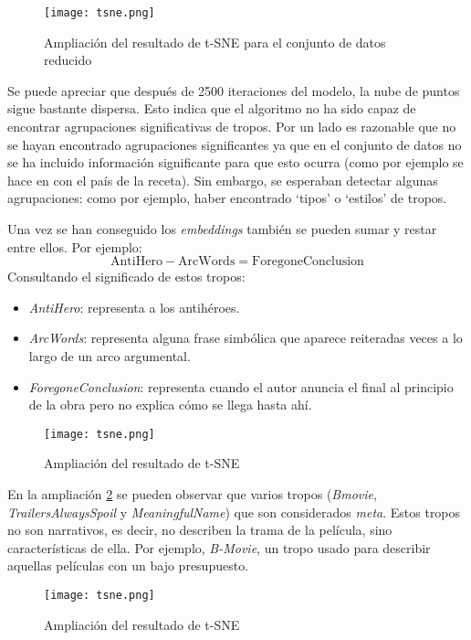 \begin{figure}\label{tsne}
  \texttt{[image: tsne.png]}
  \centering
  \caption{Ampliación del resultado de t-SNE para el conjunto de datos reducido}
\end{figure}

Se puede apreciar que después de 2500 iteraciones del modelo, la nube de puntos sigue bastante dispersa. Esto indica que el algoritmo no ha sido capaz de encontrar
agrupaciones significativas de tropos. Por un lado es razonable que no se hayan encontrado agrupaciones significantes ya que en el conjunto de datos no se ha incluido
información significante para que esto ocurra (como por ejemplo se hace en \cite{kazama2018neural} con el país de la receta). Sin embargo, se esperaban detectar algunas
agrupaciones: como por ejemplo, haber encontrado `tipos' o `estilos' de tropos.

Una vez se han conseguido los \textit{embeddings} también se pueden sumar y restar entre ellos. Por ejemplo:
\begin{equation}
  \text{AntiHero} - \text{ArcWords} = \text{ForegoneConclusion}
\end{equation}
Consultando el significado de estos tropos:
\begin{itemize}
  \item \textit{AntiHero}: representa a los antihéroes.
  \item \textit{ArcWords}: representa alguna frase simbólica que aparece reiteradas veces a lo largo de un arco argumental.
  \item \textit{ForegoneConclusion}: representa cuando el autor anuncia el final al principio de la obra pero no explica cómo se llega hasta ahí.
\end{itemize}

\begin{figure}\label{ampliacion_meta}
  \texttt{[image: tsne.png]}
  \centering
  \caption{Ampliación del resultado de t-SNE}
\end{figure}

En la ampliación \ref{ampliacion_meta} se pueden observar que varios tropos (\textit{Bmovie}, \textit{TrailersAlwaysSpoil} y \textit{MeaningfulName}) que son considerados \textit{meta}. Estos tropos no son narrativos,
es decir, no describen la trama de la película, sino características de ella. Por ejemplo, \textit{B-Movie}, un tropo usado para describir aquellas películas con un bajo presupuesto.

\begin{figure}\label{ampliacion_fecha}
  \texttt{[image: tsne.png]}
  \centering
  \caption{Ampliación del resultado de t-SNE}
\end{figure}

